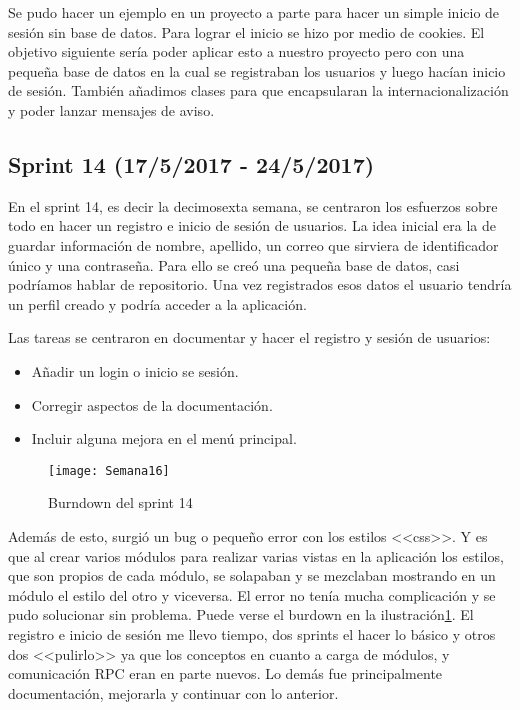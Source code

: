 Se pudo hacer un ejemplo en un proyecto a parte para hacer un simple inicio de sesión sin base de datos. Para lograr el inicio se hizo por medio de cookies. El objetivo siguiente sería poder aplicar esto a nuestro proyecto pero con una pequeña base de datos en la cual se registraban los usuarios y luego hacían inicio de sesión. También añadimos clases para que encapsularan la internacionalización y poder lanzar mensajes de aviso.

\subsection{Sprint 14 (17/5/2017 - 24/5/2017)}

En el sprint 14, es decir la decimosexta semana, se centraron los esfuerzos sobre todo en hacer un registro e inicio de sesión de usuarios. La idea inicial era la de guardar información de nombre, apellido, un correo que sirviera de identificador único y una contraseña. Para ello se creó una pequeña base de datos, casi podríamos hablar de repositorio. Una vez registrados esos datos el usuario tendría un perfil creado y podría acceder a la aplicación.

Las tareas se centraron en documentar y hacer el registro y sesión de usuarios:
\begin{itemize}
\item Añadir un login o inicio se sesión.
\item Corregir aspectos de la documentación.
\item Incluir alguna mejora en el menú principal.
\end{itemize}

\begin{figure}[h]
\centering
\texttt{[image: Semana16]}
\caption{Burndown del sprint 14}
\label{fig:A.13}
\end{figure}

Además de esto, surgió un bug o pequeño error con los estilos <<css>>. Y es que al crear varios módulos para realizar varias vistas en la aplicación los estilos, que son propios de cada módulo, se solapaban y se mezclaban mostrando en un módulo el estilo del otro y viceversa. El error no tenía mucha complicación y se pudo solucionar sin problema. Puede verse el burdown en la ilustración\ref{fig:A.13}.
El registro e inicio de sesión me llevo tiempo, dos sprints el hacer lo básico y otros dos <<pulirlo>> ya que los conceptos en cuanto a carga de módulos, y comunicación RPC eran en parte nuevos. Lo demás fue principalmente documentación, mejorarla y continuar con lo anterior.

